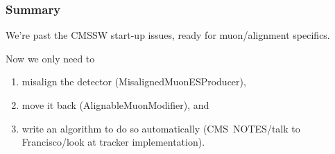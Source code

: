 \documentclass[12pt,compress]{beamer}
\begin{document}
\begin{frame}
\frametitle{Summary}
We're past the CMSSW start-up issues, ready for muon/alignment specifics.

\vfill
Now we only need to
\begin{enumerate}
\item misalign the detector (MisalignedMuonESProducer),
\item move it back (AlignableMuonModifier), and
\item write an algorithm to do so automatically (CMS~NOTES/talk to
Francisco/look at tracker implementation).
\end{enumerate}
\label{numpages}
\end{frame}
\end{document}
